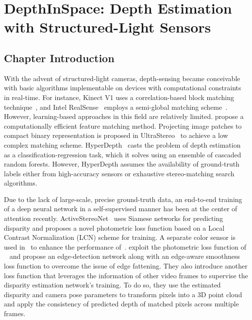 \chapter{DepthInSpace: Depth Estimation with Structured-Light Sensors}


\section{Chapter Introduction} \label{sec:chapter2}

With the advent of structured-light cameras, depth-sensing became conceivable with basic algorithms implementable on devices with computational constraints in real-time. For instance, Kinect V1 uses a correlation-based block matching technique~\cite{scharstein2002taxonomy}, and Intel RealSense~\cite{keselman2017intel} employs a semi-global matching scheme~\cite{hirschmuller2007stereo}. However, learning-based approaches in this field are relatively limited. \cite{ryan2017low} propose a computationally efficient feature matching method. Projecting image patches to compact binary representation is proposed in UltraStereo~\cite{fanello2017ultrastereo} to achieve a low complex matching scheme. HyperDepth~\cite{ryan2016hyperdepth} casts the problem of depth estimation as a classification-regression task, which it solves using an ensemble of cascaded random forests. However, HyperDepth assumes the availability of ground-truth labels either from high-accuracy sensors or exhaustive stereo-matching search algorithms.

Due to the lack of large-scale, precise ground-truth data, an end-to-end training of a deep neural network in a self-supervised manner has been at the center of attention recently. ActiveStereoNet~\cite{zhang2018activestereonet} uses Siamese networks for predicting disparity and proposes a novel photometric loss function based on a Local Contrast Normalization (LCN) scheme for training. A separate color sensor is used in~\cite{kleitsiotis2019color} to enhance the performance of~\cite{zhang2018activestereonet}. \cite{riegler2019connecting} exploit the photometric loss function of ~\cite{zhang2018activestereonet} and propose an edge-detection network along with an edge-aware smoothness loss function to overcome the issue of edge fattening. They also introduce another loss function that leverages the information of other video frames to supervise the disparity estimation network's training. To do so, they use the estimated disparity and camera pose parameters to transform pixels into a 3D point cloud and apply the consistency of predicted depth of matched pixels across multiple frames. 

